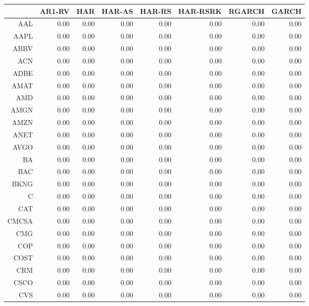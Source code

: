 \begin{table}[ht]
\centering
\begin{tabular}{rrrrrrrr}
  \hline
 & AR1-RV & HAR & HAR-AS & HAR-RS & HAR-RSRK & RGARCH & GARCH \\ 
  \hline
AAL & 0.00 & 0.00 & 0.00 & 0.00 & 0.00 & 0.00 & 0.00 \\ 
  AAPL & 0.00 & 0.00 & 0.00 & 0.00 & 0.00 & 0.00 & 0.00 \\ 
  ABBV & 0.00 & 0.00 & 0.00 & 0.00 & 0.00 & 0.00 & 0.00 \\ 
  ACN & 0.00 & 0.00 & 0.00 & 0.00 & 0.00 & 0.00 & 0.00 \\ 
  ADBE & 0.00 & 0.00 & 0.00 & 0.00 & 0.00 & 0.00 & 0.00 \\ 
  AMAT & 0.00 & 0.00 & 0.00 & 0.00 & 0.00 & 0.00 & 0.00 \\ 
  AMD & 0.00 & 0.00 & 0.00 & 0.00 & 0.00 & 0.00 & 0.00 \\ 
  AMGN & 0.00 & 0.00 & 0.00 & 0.00 & 0.00 & 0.00 & 0.00 \\ 
  AMZN & 0.00 & 0.00 & 0.00 & 0.00 & 0.00 & 0.00 & 0.00 \\ 
  ANET & 0.00 & 0.00 & 0.00 & 0.00 & 0.00 & 0.00 & 0.00 \\ 
  AVGO & 0.00 & 0.00 & 0.00 & 0.00 & 0.00 & 0.00 & 0.00 \\ 
  BA & 0.00 & 0.00 & 0.00 & 0.00 & 0.00 & 0.00 & 0.00 \\ 
  BAC & 0.00 & 0.00 & 0.00 & 0.00 & 0.00 & 0.00 & 0.00 \\ 
  BKNG & 0.00 & 0.00 & 0.00 & 0.00 & 0.00 & 0.00 & 0.00 \\ 
  C & 0.00 & 0.00 & 0.00 & 0.00 & 0.00 & 0.00 & 0.00 \\ 
  CAT & 0.00 & 0.00 & 0.00 & 0.00 & 0.00 & 0.00 & 0.00 \\ 
  CMCSA & 0.00 & 0.00 & 0.00 & 0.00 & 0.00 & 0.00 & 0.00 \\ 
  CMG & 0.00 & 0.00 & 0.00 & 0.00 & 0.00 & 0.00 & 0.00 \\ 
  COP & 0.00 & 0.00 & 0.00 & 0.00 & 0.00 & 0.00 & 0.00 \\ 
  COST & 0.00 & 0.00 & 0.00 & 0.00 & 0.00 & 0.00 & 0.00 \\ 
  CRM & 0.00 & 0.00 & 0.00 & 0.00 & 0.00 & 0.00 & 0.00 \\ 
  CSCO & 0.00 & 0.00 & 0.00 & 0.00 & 0.00 & 0.00 & 0.00 \\ 
  CVS & 0.00 & 0.00 & 0.00 & 0.00 & 0.00 & 0.00 & 0.00 \\ 

\end{tabular}
\end{table}
